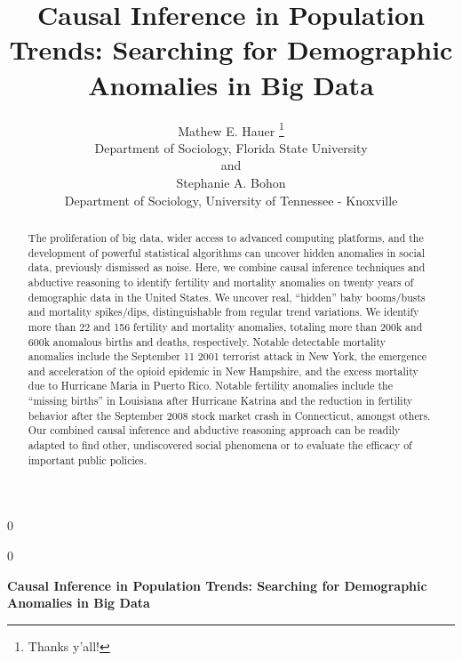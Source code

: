 \documentclass[12pt]{article}
\newcommand{\blind}{0}
\begin{document}
\def\spacingset#1{\renewcommand{\baselinestretch}%
{#1}\small\normalsize} \spacingset{1}



\blind
{
  \title{\bf Causal Inference in Population Trends: Searching for
Demographic Anomalies in Big Data}

  \author{
        Mathew E. Hauer \thanks{Thanks y'all!} \\
    Department of Sociology, Florida State University\\
     and \\     Stephanie A. Bohon \\
    Department of Sociology, University of Tennessee - Knoxville\\
      }
  \maketitle
} \fi

\blind
{
  \bigskip
  \bigskip
  \bigskip
  \begin{center}
    {\LARGE\bf Causal Inference in Population Trends: Searching for
Demographic Anomalies in Big Data}
  \end{center}
  \medskip
} \fi

\bigskip
\begin{abstract}
The proliferation of big data, wider access to advanced computing
platforms, and the development of powerful statistical algorithms can
uncover hidden anomalies in social data, previously dismissed as noise.
Here, we combine causal inference techniques and abductive reasoning to
identify fertility and mortality anomalies on twenty years of
demographic data in the United States. We uncover real, ``hidden'' baby
booms/busts and mortality spikes/dips, distinguishable from regular
trend variations. We identify more than 22 and 156 fertility and
mortality anomalies, totaling more than 200k and 600k anomalous births
and deaths, respectively. Notable detectable mortality anomalies include
the September 11 2001 terrorist attack in New York, the emergence and
acceleration of the opioid epidemic in New Hampshire, and the excess
mortality due to Hurricane Maria in Puerto Rico. Notable fertility
anomalies include the ``missing births'' in Louisiana after Hurricane
Katrina and the reduction in fertility behavior after the September 2008
stock market crash in Connecticut, amongst others. Our combined causal
inference and abductive reasoning approach can be readily adapted to
find other, undiscovered social phenomena or to evaluate the efficacy of
important public policies.
\end{abstract}
\end{document}
